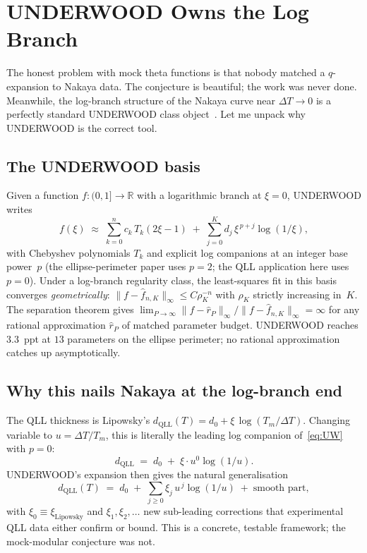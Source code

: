 \documentclass[11pt,letterpaper]{article}
\theoremstyle{plain}
\theoremstyle{definition}
\newcommand{\R}{\mathbb{R}}
\begin{document}
\section{UNDERWOOD Owns the Log Branch}

The honest problem with mock theta functions is that nobody
matched a $q$-expansion to Nakaya data.  The conjecture is
beautiful; the work was never done.  Meanwhile, the log-branch
structure of the Nakaya curve near $\Delta T \to 0$ is a perfectly
standard UNDERWOOD class object~\cite{Underwood2026}.  Let me
unpack why UNDERWOOD is the correct tool.

\subsection{The UNDERWOOD basis}

Given a function $f : (0,1] \to \R$ with a logarithmic branch at
$\xi = 0$, UNDERWOOD writes
\begin{equation}\label{eq:UW}
  f(\xi) \;\approx\; \sum_{k=0}^{n} c_k\,T_k(2\xi - 1) \;+\;
                    \sum_{j=0}^{K} d_j\,\xi^{\,p+j}\log(1/\xi),
\end{equation}
with Chebyshev polynomials $T_k$ and explicit log companions at
an integer base power~$p$ (the ellipse-perimeter paper uses
$p = 2$; the QLL application here uses $p = 0$).  Under a
log-branch regularity class, the least-squares fit in this basis
converges \emph{geometrically}:
$\|f - \hat f_{n,K}\|_\infty \le C \rho_K^{-n}$ with $\rho_K$
strictly increasing in~$K$.  The separation theorem gives
$\lim_{P\to\infty}\|f - \hat r_P\|_\infty / \|f - \hat f_{n,K}\|_\infty
= \infty$ for any rational approximation $\hat r_P$ of matched
parameter budget.  UNDERWOOD reaches $3.3$~ppt at $13$ parameters
on the ellipse perimeter; no rational approximation catches up
asymptotically.

\subsection{Why this nails Nakaya at the log-branch end}

The QLL thickness is Lipowsky's
$d_{\text{QLL}}(T) = d_0 + \xi\,\log(T_m/\Delta T)$.  Changing
variable to $u = \Delta T/T_m$, this is literally the leading
log companion of~\eqref{eq:UW} with $p = 0$:
\begin{equation}\label{eq:lipowsky-underwood}
  d_{\text{QLL}} \;=\; d_0 \;+\; \xi \cdot u^0 \log(1/u).
\end{equation}
UNDERWOOD's expansion then gives the natural generalisation
\begin{equation}\label{eq:xi-series}
  d_{\text{QLL}}(T) \;=\; d_0
    \;+\; \sum_{j \ge 0} \xi_j \, u^{\,j} \log(1/u)
    \;+\; \text{smooth part},
\end{equation}
with $\xi_0 \equiv \xi_{\text{Lipowsky}}$ and $\xi_1, \xi_2, \ldots$
new sub-leading corrections that experimental QLL data either
confirm or bound.  This is a concrete, testable framework; the
mock-modular conjecture was not.
\end{document}
